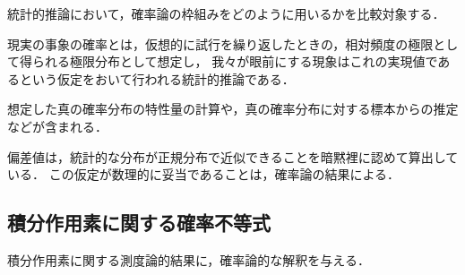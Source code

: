 \documentclass[uplatex,dvipdfmx]{jsreport}
\begin{document}
\begin{tcolorbox}[colframe=ForestGreen, colback=ForestGreen!10!white,breakable,colbacktitle=ForestGreen!40!white,coltitle=black,fonttitle=\bfseries\sffamily,
title=]
    統計的推論において，確率論の枠組みをどのように用いるかを比較対象する．
\end{tcolorbox}

\begin{definition}
    現実の事象の確率とは，仮想的に試行を繰り返したときの，相対頻度の極限として得られる極限分布として想定し，
    我々が眼前にする現象はこれの実現値であるという仮定をおいて行われる統計的推論である．

    想定した真の確率分布の特性量の計算や，真の確率分布に対する標本からの推定などが含まれる．
\end{definition}
\begin{example}[頻度主義的推論]
    偏差値は，統計的な分布が正規分布で近似できることを暗黙裡に認めて算出している．
    この仮定が数理的に妥当であることは，確率論の結果による．
\end{example}

\subsection{積分作用素に関する確率不等式}

\begin{tcolorbox}[colframe=ForestGreen, colback=ForestGreen!10!white,breakable,colbacktitle=ForestGreen!40!white,coltitle=black,fonttitle=\bfseries\sffamily,
title=]
    積分作用素に関する測度論的結果に，確率論的な解釈を与える．
\end{tcolorbox}
\end{document}
